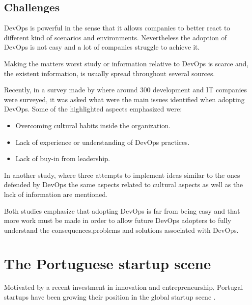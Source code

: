       
      \subsection{Challenges}\label{devops:challenges}
    
    	DevOps is powerful in the sense that it allows companies to better react to different kind of scenarios and environments. Nevertheless the adoption of DevOps is not easy and a lot of companies struggle to achieve it. 
    
    Making the matters worst study or information relative to DevOps is scarce \cite{SaugatuckTechnology2014} and, the existent information, is usually spread throughout several sources. 

    Recently, in a survey made by \cite{SaugatuckTechnology2014} where around 300 development and IT companies were surveyed, it was asked what were the main issues identified when adopting DevOps. Some of the highlighted aspects emphasized  were: 
    \begin{itemize}
       	\item{Overcoming cultural habits inside the organization.}
        \item{Lack of experience or understanding of DevOps practices.}
        \item{Lack of buy-in from leadership.}
	\end{itemize}
    
    In another study, \cite{Debois2008} where three attempts to implement ideas similar to the ones defended by DevOps the same aspects related to cultural aspects as well as the lack of information are mentioned.
    	
    Both studies emphasize that adopting DevOps is far from being easy and that more work must be made in order to allow future DevOps adopters to fully understand the consequences,problems and solutions associated with DevOps.
      


	\section{The Portuguese startup scene}
    	Motivated by a recent investment in innovation and entrepreneurship, Portugal startups have been growing their position in the global startup scene \cite{Coleman2015}.  
        
